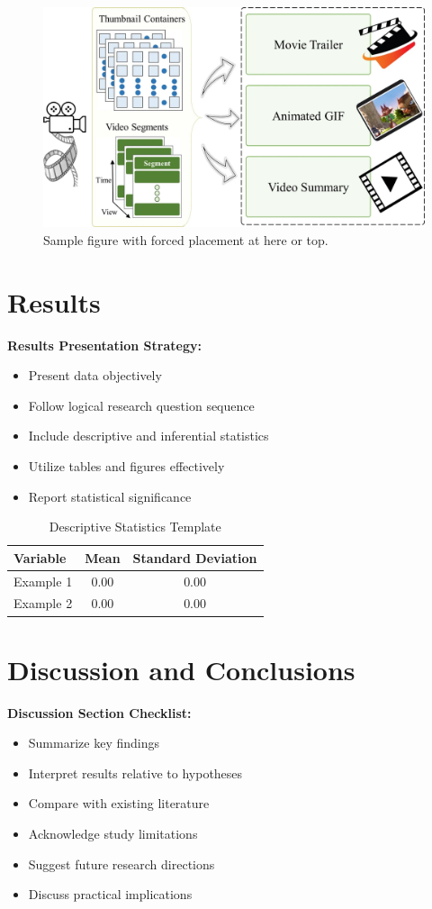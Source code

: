 \documentclass[stu,12pt,floatsintext]{apa7}
\begin{document}
\begin{figure}[!ht]
    \centering
    \includegraphics[width=0.6\linewidth]{figures/sample_img.png}
    \caption{Sample figure with forced placement at here or top.}
    \label{fig:sample_figure}
\end{figure}

\section{Results}
\textbf{Results Presentation Strategy:}
\begin{itemize}
    \item Present data objectively
    \item Follow logical research question sequence
    \item Include descriptive and inferential statistics
    \item Utilize tables and figures effectively
    \item Report statistical significance
\end{itemize}

\begin{table}[ht]
    \caption{Descriptive Statistics Template}
    \centering
    \begin{tabular}{lcc}
        \hline
        Variable & Mean & Standard Deviation \\
        \hline
        Example 1 & 0.00 & 0.00 \\
        Example 2 & 0.00 & 0.00 \\
        \hline
    \end{tabular}
\end{table}

\section{Discussion and Conclusions}
\textbf{Discussion Section Checklist:}
\begin{itemize}
    \item Summarize key findings
    \item Interpret results relative to hypotheses
    \item Compare with existing literature
    \item Acknowledge study limitations
    \item Suggest future research directions
    \item Discuss practical implications
\end{itemize}
\end{document}

